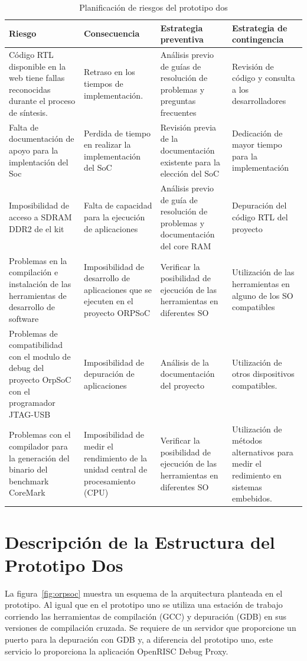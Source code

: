  		\begin{table}[h!]
		\centering
		\begin{tabular}{ p{4cm} p{4cm} p{4cm} p{3cm} }
		\hline 
		\rowcolor[gray]{0.8} Riesgo & Consecuencia & Estrategia preventiva & Estrategia de contingencia\\
		\hline
	Código RTL disponible en la web tiene fallas reconocidas durante el proceso de síntesis.&Retraso en los tiempos de implementación.& Análisis previo de guías de resolución de problemas y preguntas frecuentes & Revisión de código y consulta a los desarrolladores \\		 
		\hline
		Falta de documentación de apoyo para la implentación
del Soc& Perdida de tiempo en realizar la implementación
del SoC & Revisión previa de la documentación existente para la elección del
SoC & Dedicación de mayor tiempo para la implementación\\ 
		\hline
		 Imposibilidad de acceso a SDRAM DDR2 de el kit & Falta de capacidad para la ejecución de aplicaciones & Análisis previo de guía de resolución de problemas y documentación del core RAM & Depuración del código RTL del proyecto\\
		\hline
		Problemas en la compilación e instalación de las herramientas de desarrollo de software & Imposibilidad de desarrollo de aplicaciones que se ejecuten en el proyecto ORPSoC & Verificar la posibilidad de ejecución de las herramientas en diferentes SO & Utilización de las herramientas en alguno de los SO compatibles\\			
		\hline
		Problemas de compatibilidad con el modulo de debug del proyecto OrpSoC con el programador JTAG-USB & Imposibilidad de depuración de aplicaciones &Análisis de la documentación del proyecto& Utilización de otros  dispositivos compatibles.\\		
		\hline
		Problemas con el compilador para la generación del binario del benchmark CoreMark & Imposibilidad de medir el rendimiento de la unidad central de procesamiento (CPU) & Verificar la posibilidad de ejecución de las herramientas en diferentes SO & Utilización de métodos alternativos para medir el redimiento en sistemas embebidos.\\
		\hline
		\end{tabular}
		\caption{Planificación de riesgos del prototipo dos}
		\label{tab:planificación2}
		\end{table}


\newpage
		\section{Descripción de la Estructura del Prototipo Dos}
		La figura~\ref{fig:orpsoc} muestra un esquema de la arquitectura planteada en el prototipo. Al igual que en el prototipo uno se utiliza una estación
		de trabajo corriendo las herramientas de compilación (GCC) y depuración (GDB) en sus versiones de compilación cruzada. Se requiere de un servidor
		que proporcione un puerto para la depuración con GDB y, a diferencia del prototipo uno, este servicio lo proporciona la aplicación OpenRISC Debug
		Proxy.
		

